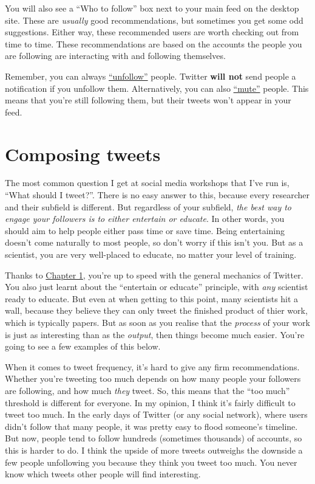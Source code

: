 \documentclass[]{book}
\begin{document}
You will also see a ``Who to follow'' box next to your main feed on the desktop site. These are \emph{usually} good recommendations, but sometimes you get some odd suggestions. Either way, these recommended users are worth checking out from time to time. These recommendations are based on the accounts the people you are following are interacting with and following themselves.

Remember, you can always \href{https://help.twitter.com/en/using-twitter/how-to-unfollow-on-twitter}{``unfollow''} people. Twitter \textbf{will not} send people a notification if you unfollow them. Alternatively, you can also \href{https://help.twitter.com/en/using-twitter/twitter-mute}{``mute''} people. This means that you're still following them, but their tweets won't appear in your feed.

\hypertarget{composing-tweets}{%
\chapter{Composing tweets}\label{composing-tweets}}

The most common question I get at social media workshops that I've run is, ``What should I tweet?''. There is no easy answer to this, because every researcher and their subfield is different. But regardless of your subfield, \emph{the best way to engage your followers is to either entertain or educate}. In other words, you should aim to help people either pass time or save time. Being entertaining doesn't come naturally to most people, so don't worry if this isn't you. But as a scientist, you are very well-placed to educate, no matter your level of training.

Thanks to \protect\hyperlink{beginner}{Chapter 1}, you're up to speed with the general mechanics of Twitter. You also just learnt about the ``entertain or educate'' principle, with \emph{any} scientist ready to educate. But even at when getting to this point, many scientists hit a wall, because they believe they can only tweet the finished product of thier work, which is typically papers. But as soon as you realise that the \emph{process} of your work is just as interesting than as the \emph{output}, then things become much easier. You're going to see a few examples of this below.

When it comes to tweet frequency, it's hard to give any firm recommendations. Whether you're tweeting too much depends on how many people your followers are following, and how much \emph{they} tweet. So, this means that the ``too much'' threshold is different for everyone. In my opinion, I think it's fairly difficult to tweet too much. In the early days of Twitter (or any social network), where users didn't follow that many people, it was pretty easy to flood someone's timeline. But now, people tend to follow hundreds (sometimes thousands) of accounts, so this is harder to do. I think the upside of more tweets outweighs the downside a few people unfollowing you because they think you tweet too much. You never know which tweets other people will find interesting.
\end{document}
